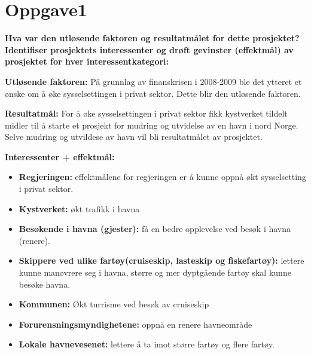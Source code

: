 \section{Oppgave1}

	{\bf Hva var den utløsende faktoren og resultatmålet for dette prosjektet?
	Identifiser prosjektets interessenter og drøft gevinster (effektmål) av 
	prosjektet for hver interessentkategori:}

	{\bf Utløsende faktoren:}
	På grunnlag av finanskrisen i 2008-2009 ble det ytteret et ønske om å øke
	sysselsettingen i privat sektor. Dette blir den utløsende faktoren. 

	{\bf Resultatmål:}
	For å øke sysselsettingen i privat sektor fikk kystverket tildelt midler til
	å starte et prosjekt for mudring og utvidelse av en havn i nord Norge. Selve
	mudring og utvildese av havn vil bli resultatmålet av prosjektet. 

	{\bf Interessenter + effektmål:}
	\begin{itemize}
		\item {\bf Regjeringen:} effektmålene for regjeringen er å kunne oppnå økt sysselsetting
		i privat sektor.
		\item {\bf Kystverket:} økt trafikk i havna
		\item{\bf Besøkende i havna (gjester):} få en bedre opplevelse ved besøk i havna (renere).
		\item{\bf Skippere ved ulike fartøy(cruiseskip, lasteskip og fiskefartøy):} lettere kunne
		manøvrere seg i havna, større og mer dyptgående fartøy skal kunne besøke havna. 
		\item {\bf Kommunen:} Økt turrisme ved besøk av cruiseskip
		\item {\bf Forurensningsmyndighetene:} oppnå en renere havneområde
		\item {\bf Lokale havnevesenet:} lettere å ta imot større fartøy og flere fartøy. 
	\end{itemize}
